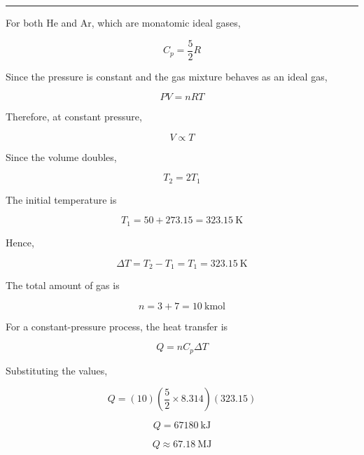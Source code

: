 \documentclass[12pt]{article}
\newcommand{\myanswer}[2]{
    \noindent{\headingfont\Large #1\space #2\par}
    \vspace{4pt}
    \hrule
    \vspace{15pt}
}
\begin{document}
\myanswer{}{Answer :}

For both He and Ar, which are monatomic ideal gases,

\begin{equation*}
C_p=\frac{5}{2}R
\end{equation*}

Since the pressure is constant and the gas mixture behaves as an ideal gas,

\begin{equation*}
PV=nRT
\end{equation*}

Therefore, at constant pressure,

\begin{equation*}
V\propto T
\end{equation*}

Since the volume doubles,

\begin{equation*}
T_2=2T_1
\end{equation*}

The initial temperature is

\begin{equation*}
T_1=50+273.15=323.15\ \mathrm{K}
\end{equation*}

Hence,

\begin{equation*}
\Delta T=T_2-T_1=T_1=323.15\ \mathrm{K}
\end{equation*}

The total amount of gas is

\begin{equation*}
n=3+7=10\ \mathrm{kmol}
\end{equation*}

For a constant-pressure process, the heat transfer is

\begin{equation*}
Q=nC_p\Delta T
\end{equation*}

Substituting the values,

\begin{equation*}
Q=(10)\left(\frac{5}{2}\times8.314\right)(323.15)
\end{equation*}

\begin{equation*}
Q=67180\ \mathrm{kJ}
\end{equation*}

\begin{equation*}
Q\approx67.18\ \mathrm{MJ}
\end{equation*}
\end{document}
